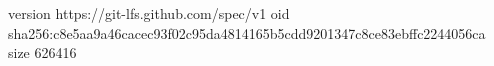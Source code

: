 version https://git-lfs.github.com/spec/v1
oid sha256:c8e5aa9a46cacec93f02c95da4814165b5cdd9201347c8ce83ebffc2244056ca
size 626416
